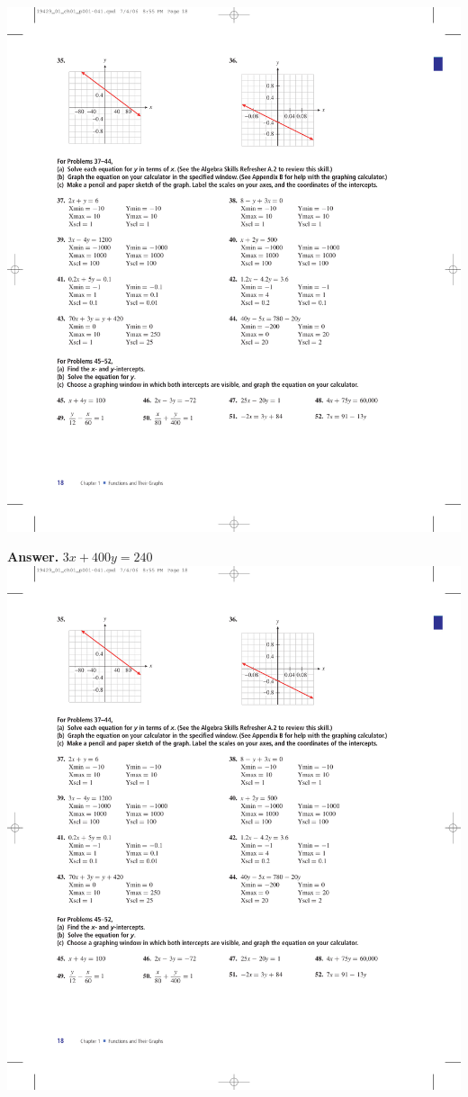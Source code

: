 \documentclass[10pt,]{book}
\theoremstyle{plain}
\theoremstyle{definition}
\theoremstyle{definition}
\theoremstyle{definition}
\theoremstyle{definition}
\numberwithin{equation}{part}
\begin{document}
\begin{exercisegroup}
\exercise[35.]\hypertarget{exercise-42}{}\includegraphics[width=0.8\linewidth]{images/fig-ex-1-1-35}
%
\par\smallskip
\noindent\textbf{Answer.}\hypertarget{answer-25}{}\quad
\(3x + 400y = 240\)%
\exercise[36.]\hypertarget{exercise-43}{}\includegraphics[width=0.8\linewidth]{images/fig-ex-1-1-36}
%
\end{exercisegroup}
\end{document}
